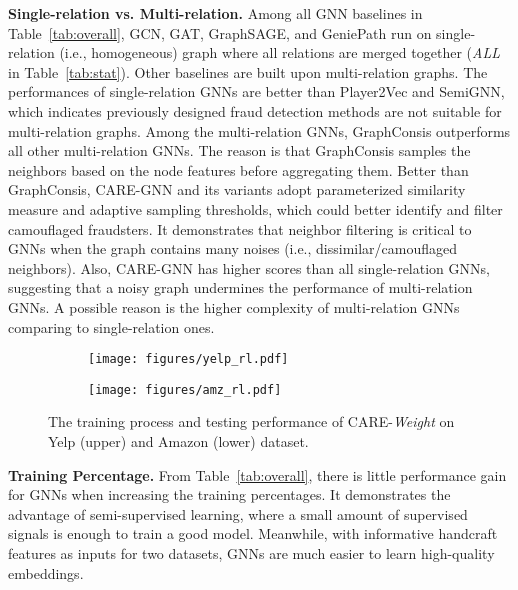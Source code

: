 \vspace{1mm}
\noindent \textbf{Single-relation vs. Multi-relation.}
Among all GNN baselines in Table~\ref{tab:overall}, GCN, GAT, GraphSAGE, and GeniePath run on single-relation (i.e., homogeneous) graph where all relations are merged together (\textit{ALL} in Table~\ref{tab:stat}).
Other baselines are built upon multi-relation graphs.
The performances of single-relation GNNs are better than Player2Vec and SemiGNN, which indicates previously designed fraud detection methods are not suitable for multi-relation graphs.
Among the multi-relation GNNs, GraphConsis outperforms all other multi-relation GNNs.
The reason is that GraphConsis samples the neighbors based on the node features before aggregating them. Better than GraphConsis, CARE-GNN and its variants adopt parameterized similarity measure and adaptive sampling thresholds, which could better identify and filter camouflaged fraudsters. 
It demonstrates that neighbor filtering is critical to GNNs when the graph contains many noises (i.e., dissimilar/camouflaged neighbors).
Also, CARE-GNN has higher scores than all single-relation GNNs, suggesting that a noisy graph undermines the performance of multi-relation GNNs.
A possible reason is the higher complexity of multi-relation GNNs comparing to single-relation ones.


\begin{figure*}
     \centering
     \begin{subfigure}[b]{0.98\textwidth}
         \centering
         \texttt{[image: figures/yelp\_rl.pdf]}
         \label{fig:yelp_rl}
     \end{subfigure}
    \bigskip
     \begin{subfigure}[b]{0.98\textwidth}
         \centering
         \texttt{[image: figures/amz\_rl.pdf]}
         \label{fig:amz_rl}
     \end{subfigure}
     \vspace*{-5mm}
        \caption{The training process and testing performance of CARE-\textit{Weight} on Yelp (upper) and Amazon (lower) dataset.} 
        \label{fig:training}
\end{figure*}


\vspace{1mm}
\noindent \textbf{Training Percentage.}
From Table~\ref{tab:overall}, there is little performance gain for GNNs when increasing the training percentages.
It demonstrates the advantage of semi-supervised learning, where a small amount of supervised signals is enough to train a good model.
Meanwhile, with informative handcraft features as inputs for two datasets, GNNs are much easier to learn high-quality embeddings. 


